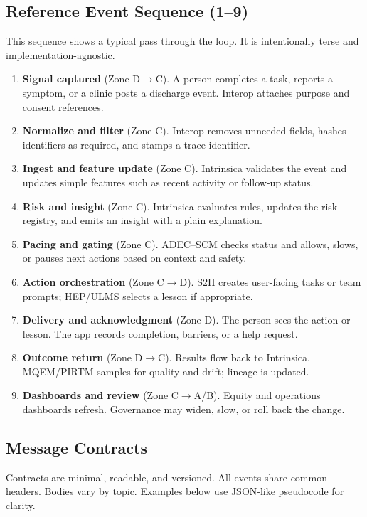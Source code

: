 \documentclass[12pt]{article}
\begin{document}
\subsection*{Reference Event Sequence (1--9)}
This sequence shows a typical pass through the loop. It is intentionally terse and implementation-agnostic.

\begin{enumerate}[leftmargin=*]
  \item \textbf{Signal captured} (Zone D$\rightarrow$C). A person completes a task, reports a symptom, or a clinic posts a discharge event. Interop attaches purpose and consent references.
  \item \textbf{Normalize and filter} (Zone C). Interop removes unneeded fields, hashes identifiers as required, and stamps a trace identifier.
  \item \textbf{Ingest and feature update} (Zone C). Intrinsica validates the event and updates simple features such as recent activity or follow-up status.
  \item \textbf{Risk and insight} (Zone C). Intrinsica evaluates rules, updates the risk registry, and emits an insight with a plain explanation.
  \item \textbf{Pacing and gating} (Zone C). ADEC--SCM checks status and allows, slows, or pauses next actions based on context and safety.
  \item \textbf{Action orchestration} (Zone C$\rightarrow$D). S2H creates user-facing tasks or team prompts; HEP/ULMS selects a lesson if appropriate.
  \item \textbf{Delivery and acknowledgment} (Zone D). The person sees the action or lesson. The app records completion, barriers, or a help request.
  \item \textbf{Outcome return} (Zone D$\rightarrow$C). Results flow back to Intrinsica. MQEM/PIRTM samples for quality and drift; lineage is updated.
  \item \textbf{Dashboards and review} (Zone C$\rightarrow$A/B). Equity and operations dashboards refresh. Governance may widen, slow, or roll back the change.
\end{enumerate}

\subsection*{Message Contracts}
Contracts are minimal, readable, and versioned. All events share common headers. Bodies vary by topic. Examples below use JSON-like pseudocode for clarity.
\end{document}
